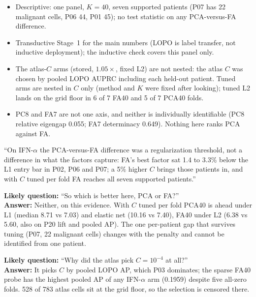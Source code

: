 \begin{caveatbox}
\begin{itemize}
  \item Descriptive: one panel, $K = 40$, seven supported patients (P07 has 22 malignant cells, P06 44, P01 45); no test statistic on any PCA-versus-FA difference.
  \item Transductive Stage~1 for the main numbers (LOPO is label transfer, not inductive deployment); the inductive check covers this panel only.
  \item The atlas-$C$ arms (stored, $1.05\times$, fixed L2) are not nested: the atlas $C$ was chosen by pooled LOPO AUPRC including each held-out patient. Tuned arms are nested in $C$ only (method and $K$ were fixed after looking); tuned L2 lands on the grid floor in 6 of 7 FA40 and 5 of 7 PCA40 folds.
  \item PC8 and FA7 are not one axis, and neither is individually identifiable (PC8 relative eigengap 0.055; FA7 determinacy 0.649). Nothing here ranks PCA against FA.
\end{itemize}
\end{caveatbox}

\begin{teambox}
``On IFN-$\alpha$ the PCA-versus-FA difference was a regularization threshold, not a difference in what the factors capture: FA's best factor sat 1.4 to 3.3\% below the L1 entry bar in P02, P06 and P07; a 5\% higher $C$ brings those patients in, and with $C$ tuned per fold FA reaches all seven supported patients.''

\textbf{Likely question:} ``So which is better here, PCA or FA?''\\
\textbf{Answer:} Neither, on this evidence. With $C$ tuned per fold PCA40 is ahead under L1 (median 8.71 vs 7.03\pp) and elastic net (10.16 vs 7.40\pp), FA40 under L2 (6.38 vs 5.60\pp, also on P20 lift and pooled AP). The one per-patient gap that survives tuning (P07, 22 malignant cells) changes with the penalty and cannot be identified from one patient.

\textbf{Likely question:} ``Why did the atlas pick $C = 10^{-4}$ at all?''\\
\textbf{Answer:} It picks $C$ by pooled LOPO AP, which P03 dominates; the sparse FA40 probe has the highest pooled AP of any IFN-$\alpha$ arm (0.1959) despite five all-zero folds. 528 of 783 atlas cells sit at the grid floor, so the selection is censored there.
\end{teambox}

